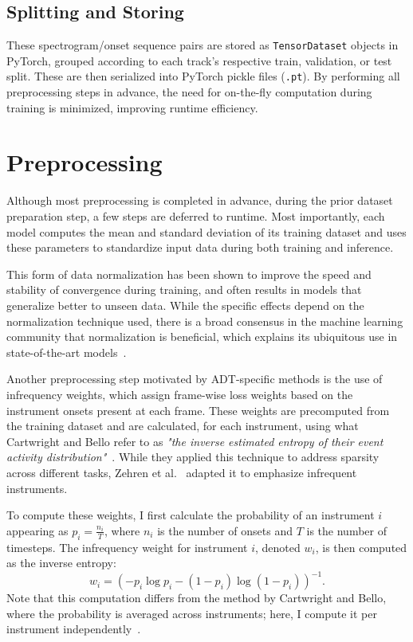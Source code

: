 \subsection{Splitting and Storing}

These spectrogram/onset sequence pairs are stored as \texttt{TensorDataset} objects in PyTorch, grouped according to each track's respective train, validation, or test split. These are then serialized into PyTorch pickle files (\texttt{.pt}). By performing all preprocessing steps in advance, the need for on-the-fly computation during training is minimized, improving runtime efficiency.

\section{Preprocessing}

Although most preprocessing is completed in advance, during the prior dataset preparation step, a few steps are deferred to runtime. Most importantly, each model computes the mean and standard deviation of its training dataset and uses these parameters to standardize input data during both training and inference. 

This form of data normalization has been shown to improve the speed and stability of convergence during training, and often results in models that generalize better to unseen data. While the specific effects depend on the normalization technique used, there is a broad consensus in the machine learning community that normalization is beneficial, which explains its ubiquitous use in state-of-the-art models~\cite{10056354}.

Another preprocessing step motivated by \gls{ADT}-specific methods is the use of infrequency weights, which assign frame-wise loss weights based on the instrument onsets present at each frame. These weights are precomputed from the training dataset and are calculated, for each instrument, using what Cartwright and Bello refer to as \textit{"the inverse estimated entropy of their event activity distribution"}~\cite{cartwright2018increasing}. While they applied this technique to address sparsity across different tasks, Zehren et al.~\cite{signals4040042} adapted it to emphasize infrequent instruments.

To compute these weights, I first calculate the probability of an instrument $i$ appearing as $p_i = \frac{n_i}{T}$, where $n_i$ is the number of onsets and $T$ is the number of timesteps. The infrequency weight for instrument $i$, denoted $w_i$, is then computed as the inverse entropy: \[w_i = \left(-p_i\log p_i - (1 - p_i)\log{(1 - p_i)}\right)^{-1}.\] Note that this computation differs from the method by Cartwright and Bello, where the probability is averaged across instruments; here, I compute it per instrument independently~\cite{cartwright2018increasing}. 

